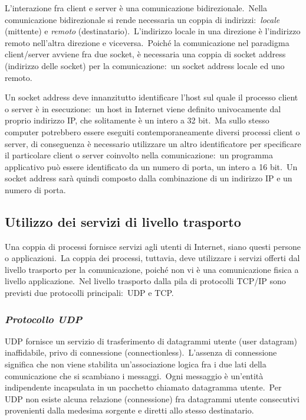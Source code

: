L'interazione fra client e server è una comunicazione bidirezionale.\
Nella comunicazione bidirezionale si rende necessaria un coppia di indirizzi:\ \emph{locale} (mittente) e \emph{remoto} (destinatario).\
L'indirizzo locale in una direzione è l'indirizzo remoto nell'altra direzione e viceversa.\
Poiché la comunicazione nel paradigma client/server avviene fra due socket, è necessaria una coppia di socket address (indirizzo delle socket) per la comunicazione:\ un socket address locale ed uno remoto.

Un socket address deve innanzitutto identificare l'host sul quale il processo client o server è in esecuzione:\ un host in Internet viene definito univocamente dal proprio indirizzo IP, che solitamente è un intero a 32 bit.\
Ma sullo stesso computer potrebbero essere eseguiti contemporaneamente diversi processi client o server, di conseguenza è necessario utilizzare un altro identificatore per specificare il particolare client o server coinvolto nella comunicazione:\ un programma applicativo può essere identificato da un numero di porta, un intero a 16 bit.\
Un socket address sarà quindi composto dalla combinazione di un indirizzo IP e un numero di porta.

\subsection{Utilizzo dei servizi di livello trasporto}

Una coppia di processi fornisce servizi agli utenti di Internet, siano questi persone o applicazioni.\
La coppia dei processi, tuttavia, deve utilizzare i servizi offerti dal livello trasporto per la comunicazione, poiché non vi è una comunicazione fisica a livello applicazione.\
Nel livello trasporto dalla pila di protocolli TCP/IP sono previsti due protocolli principali:\ UDP e TCP.

\subsubsection{\emph{Protocollo UDP}}

UDP fornisce un servizio di trasferimento di datagrammi utente (user datagram) inaffidabile, privo di connessione (connectionless).\
L'assenza di connessione significa che non viene stabilita un'associazione logica fra i due lati della comunicazione che si scambiano i messaggi.\
Ogni messaggio è un'entità indipendente incapsulata in un pacchetto chiamato datagramma utente.\
Per UDP non esiste alcuna relazione (connessione) fra datagrammi utente consecutivi provenienti dalla medesima sorgente e diretti allo stesso destinatario.

